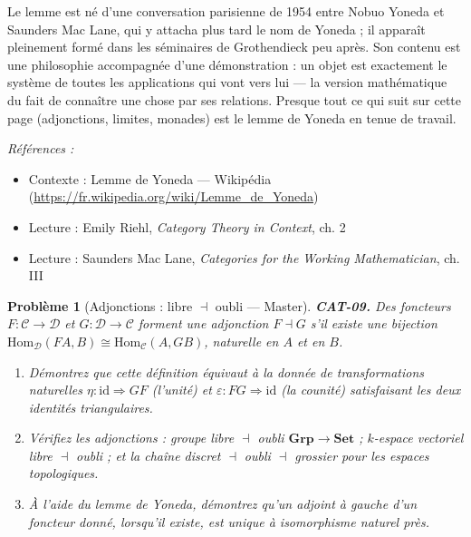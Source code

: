 \documentclass[11pt]{article}
\newtheorem{problem}{Problème}
\newenvironment{refs}{\par\small\noindent\emph{Références :}\begin{itemize}\setlength\itemsep{0pt}}{\end{itemize}\normalsize}
\begin{document}
\noindent Le lemme est né d'une conversation parisienne de 1954 entre Nobuo Yoneda et
Saunders Mac Lane, qui y attacha plus tard le nom de Yoneda ; il apparaît pleinement formé dans
les séminaires de Grothendieck peu après. Son contenu est une philosophie accompagnée d'une
démonstration : un objet est exactement le système de toutes les applications qui vont vers lui ---
la version mathématique du fait de connaître une chose par ses relations. Presque tout ce qui
suit sur cette page (adjonctions, limites, monades) est le lemme de Yoneda en tenue de travail.

\begin{refs}
\item Contexte : Lemme de Yoneda --- Wikipédia (\url{https://fr.wikipedia.org/wiki/Lemme_de_Yoneda})
\item Lecture : Emily Riehl, \textit{Category Theory in Context}, ch. 2
\item Lecture : Saunders Mac Lane, \textit{Categories for the Working Mathematician}, ch. III
\end{refs}

\bigskip

\begin{problem}[{Adjonctions : libre $\dashv$ oubli --- Master}]
\textbf{CAT-09.} Des foncteurs $ F\colon \mathcal{C} \to \mathcal{D} $ et
$ G\colon \mathcal{D} \to \mathcal{C} $ forment une adjonction $ F \dashv G $ s'il existe une
bijection $ \mathrm{Hom}_{\mathcal{D}}(F A, B) \cong \mathrm{Hom}_{\mathcal{C}}(A, G B) $,
naturelle en $ A $ et en $ B $.
\begin{enumerate}
\item[(a)] Démontrez que cette définition équivaut à la donnée de
transformations naturelles $ \eta\colon \mathrm{id} \Rightarrow GF $ (l'unité) et
$ \varepsilon\colon FG \Rightarrow \mathrm{id} $ (la counité) satisfaisant les deux identités
triangulaires.
\item[(b)] Vérifiez les adjonctions : groupe libre $ \dashv $ oubli
$ \mathbf{Grp} \to \mathbf{Set} $ ; $ k $-espace vectoriel libre $ \dashv $ oubli ; et la
chaîne discret $ \dashv $ oubli $ \dashv $ grossier pour les espaces topologiques.
\item[(c)] À l'aide du lemme de Yoneda, démontrez qu'un adjoint à gauche d'un foncteur donné, lorsqu'il
existe, est unique à isomorphisme naturel près.
\end{enumerate}

\end{problem}
\end{document}
